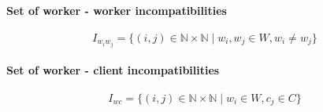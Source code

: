 \documentclass[../../thesis.tex]{subfiles}
\begin{document}
\paragraph{Set of worker - worker incompatibilities}

\begin{equation*}
    {I_{w_iw_j} = \{ ({i},{j}) \in \mathbb{N} \times \mathbb{N} \mid w_i, w_j \in W, w_i \neq w_j \}}
\end{equation*}


\paragraph{Set of worker - client incompatibilities}
\begin{equation*}
    I_{wc} = \{ (i, j) \in \mathbb{N} \times \mathbb{N} \mid w_i \in W, c_j \in C \}
\end{equation*}
\end{document}
